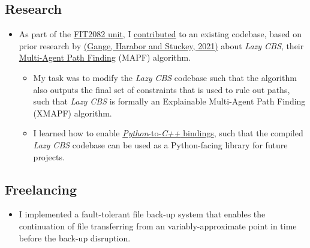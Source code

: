 \documentclass[a4paper, 10pt]{article}
\begin{document}
	\subsection{Research}
	\begin{itemize}
		\item As part of the \href{https://handbook.monash.edu/2021/units/FIT2082}{FIT2082 unit}, I \href{https://github.com/AppleGamer22/FIT2082}{contributed} to an existing codebase, based on prior research by \href{https://ojs.aaai.org/index.php/ICAPS/article/view/3471}{(Gange, Harabor and Stuckey, 2021)} about \textsl{Lazy CBS}, their \href{https://en.wikipedia.org/wiki/Pathfinding#Multi-agent_pathfinding}{Multi-Agent Path Finding} (MAPF) algorithm.
		\begin{itemize}
			\item My task was to modify the \textsl{Lazy CBS} codebase such that the algorithm also outputs the final set of constraints that is used to rule out paths, such that \textsl{Lazy CBS} is formally an Explainable Multi-Agent Path Finding (XMAPF) algorithm.
			\item I learned how to enable \href{https://pybind11.readthedocs.io/en/stable/}{\textsl{Python}-to-\textsl{C++} bindings}, such that the compiled \textsl{Lazy CBS} codebase can be used as a Python-facing library for future projects.
		\end{itemize}
	\end{itemize}

	\subsection{Freelancing}
	\begin{itemize}
		\item I implemented a fault-tolerant file back-up system that enables the continuation of file transferring from an variably-approximate point in time before the back-up disruption.
	\end{itemize}
\end{document}
